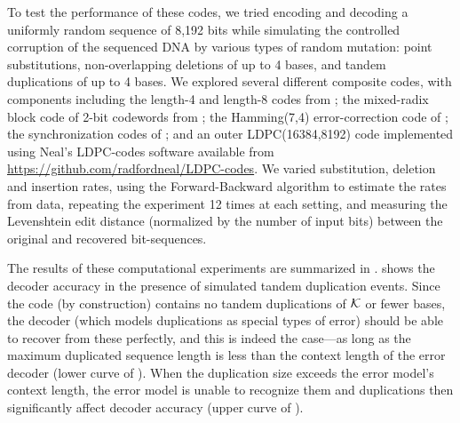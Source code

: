 \documentclass[english]{article}
\begin{document}
To test the performance of these codes, we tried encoding and decoding a uniformly random sequence of 8,192 bits
while simulating the controlled corruption of the sequenced DNA by various types of random mutation:
point substitutions, non-overlapping deletions of up to 4 bases, and tandem duplications of up to 4 bases.
We explored several different composite codes, with components including
the length-4 and length-8 codes from ;
the mixed-radix block code of 2-bit codewords from ;
the Hamming(7,4) error-correction code of ;
the synchronization codes of ;
and an outer LDPC(16384,8192) code implemented using Neal's LDPC-codes
software available from \url{https://github.com/radfordneal/LDPC-codes}.
We varied substitution, deletion and insertion rates,
using the Forward-Backward algorithm to estimate the rates from data,
repeating the experiment 12 times at each setting,
and measuring the Levenshtein edit distance (normalized by the number of input bits) between the original and recovered bit-sequences.

The results of these computational experiments are summarized in .
 shows the decoder accuracy in the presence of simulated tandem duplication events.
Since the code (by construction) contains no tandem duplications of ${\cal K}$ or fewer bases,
the decoder (which models duplications as special types of error)
should be able to recover from these perfectly, and this is indeed the case---as long
as the maximum duplicated sequence length is less than the context length of the error decoder
(lower curve of ).
When the duplication size exceeds the error model's context length,
the error model is unable to recognize them and duplications then significantly affect decoder accuracy
(upper curve of ).
\end{document}

